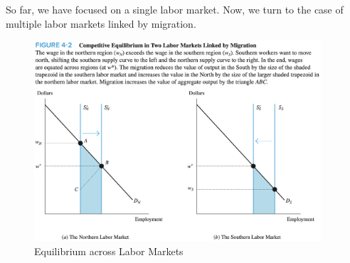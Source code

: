 So far, we have focused on a single labor market.
Now, we turn to the case of multiple labor markets
linked by migration.


\begin{figure}[!htb]
    \centering
        \includegraphics[width=0.95\textwidth]{../input/ch_4p2_multiple_markets.png}
    \caption{Equilibrium across Labor Markets}
    \label{fig:ch_4p2_multiple_markets}
\end{figure}
